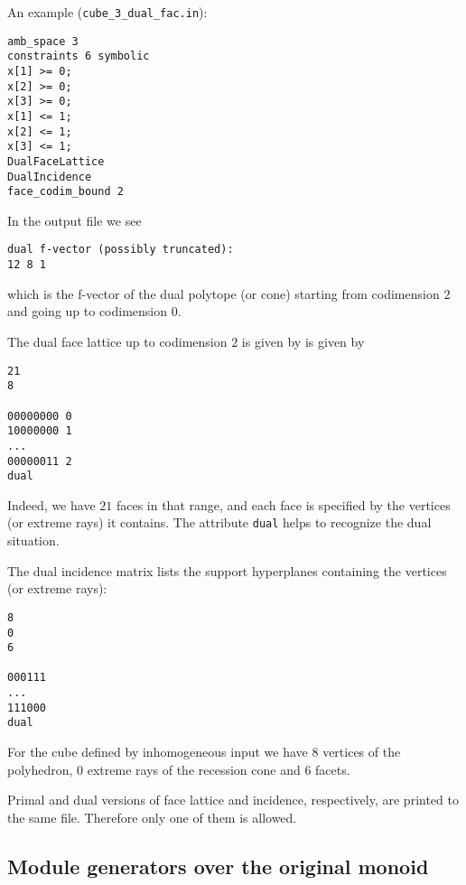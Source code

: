 An example (\verb|cube_3_dual_fac.in|):
\begin{Verbatim}
amb_space 3
constraints 6 symbolic
x[1] >= 0;
x[2] >= 0;
x[3] >= 0;
x[1] <= 1;
x[2] <= 1;
x[3] <= 1;
DualFaceLattice
DualIncidence
face_codim_bound 2
\end{Verbatim}

In the output file we see
\begin{Verbatim}
dual f-vector (possibly truncated):
12 8 1
\end{Verbatim}
which is the f-vector of the dual polytope (or cone) starting from codimension $2$ and going up to codimension $0$.

The dual face lattice up to codimension $2$ is given by is given by
\begin{Verbatim}
21
8

00000000 0
10000000 1
...
00000011 2
dual
\end{Verbatim}
Indeed, we have $21$ faces in that range, and each face is specified by the vertices (or extreme rays) it contains. The attribute \verb|dual| helps to recognize the dual situation.

The dual incidence matrix lists the support hyperplanes containing the vertices (or extreme rays):
\begin{Verbatim}
8
0
6

000111
...
111000
dual
\end{Verbatim}
For the cube defined by inhomogeneous input we have $8$ vertices of the polyhedron, $0$ extreme rays of the recession cone and $6$ facets.

Primal and dual versions of face lattice and incidence, respectively, are printed to the same file. Therefore only one of them is allowed.

\subsection{Module generators over the original monoid}\label{MinMod}

